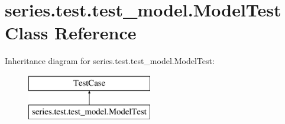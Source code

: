 \hypertarget{classseries_1_1test_1_1test__model_1_1_model_test}{}\section{series.\+test.\+test\+\_\+model.\+Model\+Test Class Reference}
\label{classseries_1_1test_1_1test__model_1_1_model_test}
Inheritance diagram for series.\+test.\+test\+\_\+model.\+Model\+Test\+:\begin{figure}[H]
\begin{center}
\leavevmode
\includegraphics[height=2.000000cm]{classseries_1_1test_1_1test__model_1_1_model_test}
\end{center}
\end{figure}
